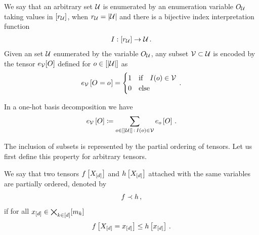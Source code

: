 \begin{definition}
    \label{def:subsetEncoding}
    We say that an arbitrary set $\mathcal{U}$ is enumerated by an enumeration variable $O_{\mathcal{U}}$ taking values in $[r_{\mathcal{U}}]$, when $r_{\mathcal{U}}=\left|\mathcal{U}\right|$ and there is a bijective index interpretation function
    \begin{align*}
        I : [r_{\mathcal{U}}] \rightarrow \mathcal{U} \, .
    \end{align*}
    Given an set $\mathcal{U}$ enumerated by the variable $O_{\mathcal{U}}$, any subset $\mathcal{V}\subset\mathcal{U}$ is encoded by the tensor $e_{\mathcal{V}}[O]$ defined for $o\in[\left|\mathcal{U}\right|]$ as
    \begin{align*}
        e_{\mathcal{V}}\left[O_{}=o_{}\right]
        = \begin{cases}
              1 & \text{if} \quad I(o) \in \mathcal{V} \\
              0 & \text{else}
        \end{cases} \, .
    \end{align*}
\end{definition}

In a one-hot basis decomposition we have
\begin{align*}
    e_{\mathcal{V}}\left[O\right]
    \coloneqq \sum_{o\in[\left|\mathcal{U}\right|]\,:\,I(o)\in\mathcal{V}}e_{o}\left[O\right] \, .
\end{align*}


The inclusion of subsets is represented by the partial ordering of tensors.
Let us first define this property for arbitrary tensors.

\begin{definition}
    \label{def:partialOrder}
    We say that two tensors $f\left[X_{[d]}\right]$ and $h\left[X_{[d]}\right]$ attached with the same variables are partially ordered, denoted by
    \begin{align*}
    {f}
        \prec{h} \, ,
    \end{align*}
    if for all $x_{[d]}\in\bigtimes_{k\in[d]}[m_{k}]$
    \begin{align*}
        f\left[X_{[d]}=x_{[d]}\right] \leq h\left[x_{[d]}\right]  \, .
    \end{align*}
\end{definition}

